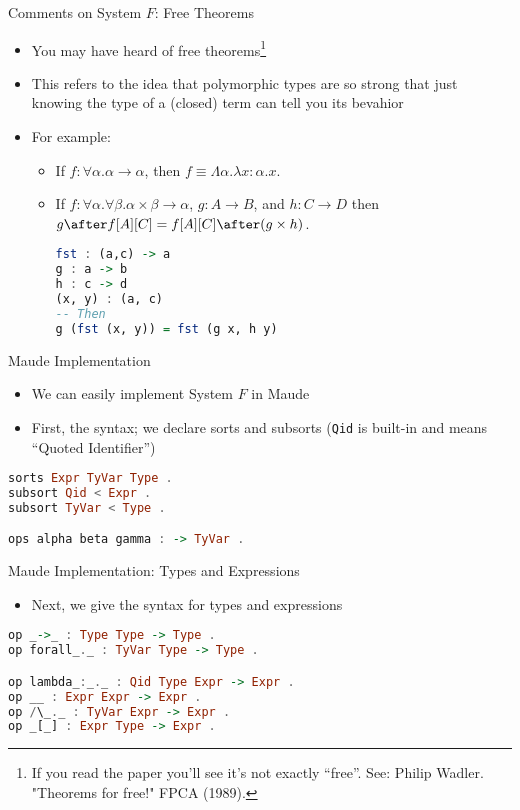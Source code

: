 \documentclass[leqno,presentation,usenames,dvipsnames]{beamer}
\begin{document}
\begin{frame}[fragile]{Comments on System $F$: Free Theorems}
    \begin{itemize}
        \item You may have heard of free theorems\footnote{If you read the paper you'll see it's not exactly ``free''. See: Philip Wadler. "Theorems for free!" FPCA (1989).}
        \item This refers to the idea that polymorphic types are so strong that just knowing the type of a (closed) term can tell you its bevahior
        \item For example:
            \begin{itemize}
                \item If $f : \forall \alpha. \alpha \to \alpha$, then $f \equiv \Lambda \alpha. \lambda x : \alpha. x$.
                \item If $f : \forall \alpha. \forall \beta. \alpha \times \beta \to \alpha$, $g : A \to B$, and $h : C \to D$ then $g \after f[A][C] = f[A][C] \after (g \times h)$.
\begin{lstlisting}[language=haskell, basicstyle=\small\ttfamily]
fst : (a,c) -> a
g : a -> b
h : c -> d
(x, y) : (a, c)
-- Then
g (fst (x, y)) = fst (g x, h y)
\end{lstlisting}
            \end{itemize}
    \end{itemize}
\end{frame}

\begin{frame}[fragile]{Maude Implementation}
    \begin{itemize}
        \item We can easily implement System $F$ in Maude
        \item First, the syntax; we declare sorts and subsorts (\texttt{Qid} is built-in and means ``Quoted Identifier'')
    \end{itemize}

\begin{lstlisting}[language=haskell, basicstyle=\small\ttfamily]
sorts Expr TyVar Type .
subsort Qid < Expr .
subsort TyVar < Type .

ops alpha beta gamma : -> TyVar .
\end{lstlisting}
\end{frame}

\begin{frame}[fragile]{Maude Implementation: Types and Expressions}
    \begin{itemize}
        \item Next, we give the syntax for types and expressions
    \end{itemize}

\begin{lstlisting}[language=haskell, basicstyle=\small\ttfamily]
op _->_ : Type Type -> Type .
op forall_._ : TyVar Type -> Type .

op lambda_:_._ : Qid Type Expr -> Expr .
op __ : Expr Expr -> Expr .
op /\_._ : TyVar Expr -> Expr .
op _[_] : Expr Type -> Expr .
\end{lstlisting}
\end{frame}
\end{document}
